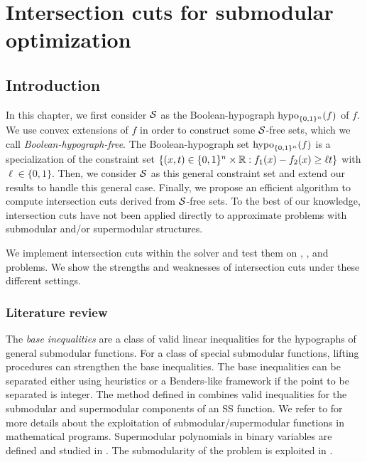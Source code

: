 \chapter{Intersection cuts for submodular optimization}
\label{chap.submax}




\section{Introduction}


  In this chapter, we first consider $\mathcal S$ as the Boolean-hypograph $\operatorname{hypo}_{\{0,1\}^n}(f)$ of $f$. We use convex extensions of $f$ in order to construct some $\mathcal S$-free sets, which we call \textit{Boolean-hypograph-free}. The Boolean-hypograph set $\operatorname{hypo}_{\{0,1\}^n}(f)$ is a specialization of the constraint set $\{(x, t) \in \{0,1\}^n \times \mathbb R: f_1(x) -f_2(x)  \ge \ell t\}$
with $ \ell \in \{0,1\}$. Then, we consider $\mathcal S$ as this general constraint set and extend our results to handle this  general case. Finally, we propose an efficient algorithm to compute intersection cuts derived from $\mathcal S$-free sets. To the best of our knowledge, intersection cuts have not  been applied directly to approximate problems with submodular and/or supermodular structures.

We implement intersection cuts within the \scip solver \cite{bestuzheva2021scip} and test them on \maxcut,  \pbm, and  \bdopt problems. We show the strengths and weaknesses of intersection cuts under these different settings.




\subsection{Literature review}

 
 
The \textit{base inequalities} \cite{nemhauser1978analysis} are a class of valid linear inequalities for the hypographs of general submodular functions. For a class of special submodular functions, lifting procedures  \cite{ahmed2011maximizing,shi2022sequence}  can strengthen the base inequalities. The  base inequalities can be separated either using heuristics \cite{ahmed2011maximizing} or a Benders-like framework \cite{coniglio2022submodular} if the point to be separated is integer. The method defined in \cite{Atamturk2021} combines valid inequalities for the submodular and supermodular components of an SS function. We refer to \cite{atamturk2020submodularity,atamturk2022supermodularity2,billionnet1985maximizing,bouhtou2010submodularity,han2022fractional,kilincc2021joint,rhys1970selection,shamaiah2010greedy,xusignomial,yu2023strong} for more details about the exploitation of  submodular/supermodular functions in mathematical programs. Supermodular polynomials in binary variables are defined and studied in \cite{billionnet1985maximizing,rhys1970selection}. The submodularity of the \dopt problem is exploited in \cite{SAGNOL2013258,shamaiah2010greedy}.


